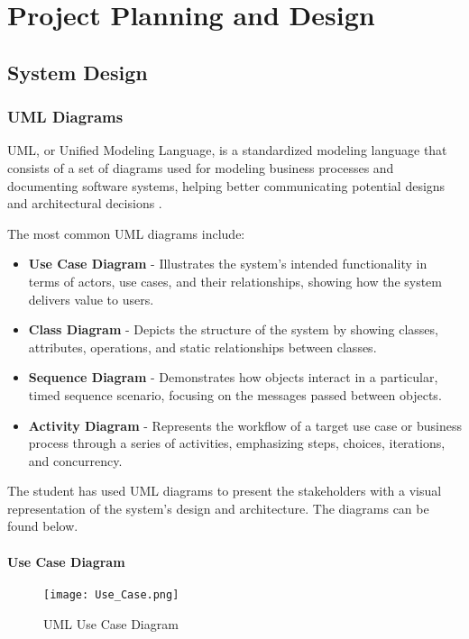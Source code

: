 \chapter{Project Planning and Design}

\section{System Design}

\subsection{UML Diagrams}

UML, or Unified Modeling Language, is a standardized modeling language that consists of a set of diagrams used for modeling business processes and documenting software systems, helping better communicating potential designs and architectural decisions \parencite{uml}. 

The most common UML diagrams include:
\begin{itemize}
    \item \textbf{Use Case Diagram} - Illustrates the system's intended functionality in terms of actors, use cases, and their relationships, showing how the system delivers value to users.
    \item \textbf{Class Diagram} - Depicts the structure of the system by showing classes, attributes, operations, and static relationships between classes.
    \item \textbf{Sequence Diagram} - Demonstrates how objects interact in a particular, timed sequence scenario, focusing on the messages passed between objects.
    \item \textbf{Activity Diagram} - Represents the workflow of a target use case or business process through a series of activities, emphasizing steps, choices, iterations, and concurrency.
\end{itemize}

The student has used UML diagrams to present the stakeholders with a visual representation of the system's design and architecture. The diagrams can be found below.

\clearpage

\subsubsection{Use Case Diagram}

\begin{figure}[ht]
\label{fig:uml_usecase}
    \centering
    \texttt{[image: Use\_Case.png]}
    \caption{UML Use Case Diagram} 
\end{figure}

